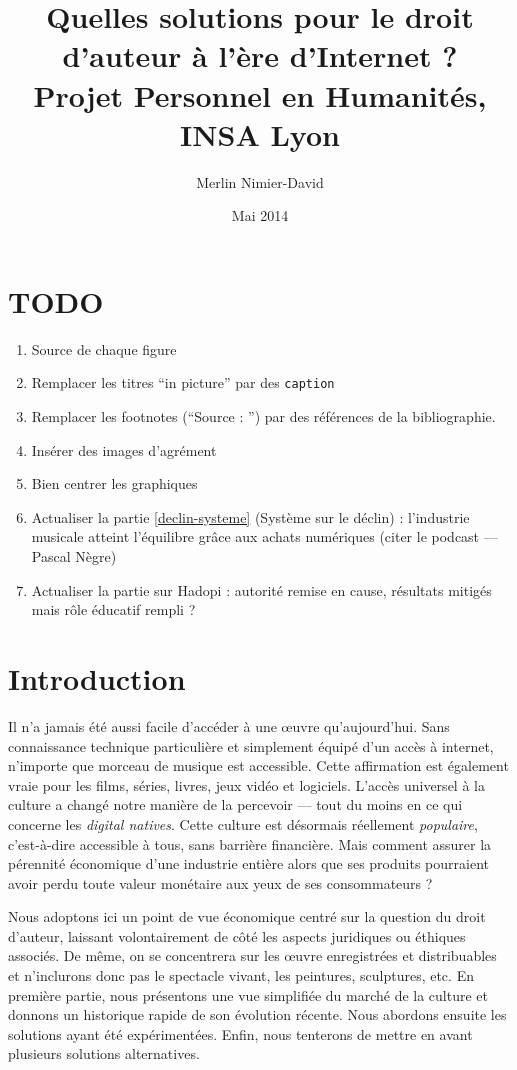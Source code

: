 \documentclass[a4paper]{report}
\title{
	Quelles solutions pour le droit d'auteur à l'ère d'Internet ?\\
	Projet Personnel en Humanités, INSA Lyon
}
\author{Merlin Nimier-David}
\date{Mai 2014}
\begin{document}
	\maketitle

	\tableofcontents

	\chapter{TODO}
	\begin{enumerate}
		\item Source de chaque figure
		\item Remplacer les titres ``in picture'' par des \texttt{caption}
		\item Remplacer les footnotes (``Source : '') par des références de la bibliographie.
		\item Insérer des images d'agrément
		\item Bien centrer les graphiques
		\item Actualiser la partie \ref{declin-systeme} (Système sur le déclin) : l'industrie musicale atteint l'équilibre grâce aux achats numériques (citer le podcast — Pascal Nègre)
		\item Actualiser la partie sur Hadopi : autorité remise en cause, résultats mitigés mais rôle éducatif rempli ?
	\end{enumerate}


	\chapter{Introduction}
	Il n'a jamais été aussi facile d'accéder à une œuvre qu'aujourd'hui. Sans connaissance technique particulière et simplement équipé d'un accès à internet, n'importe que morceau de musique est accessible. Cette affirmation est également vraie pour les films, séries, livres, jeux vidéo et logiciels. L'accès universel à la culture a changé notre manière de la percevoir — tout du moins en ce qui concerne les \emph{digital natives}. Cette culture est désormais réellement \emph{populaire}, c'est-à-dire accessible à tous, sans barrière financière. Mais comment assurer la pérennité économique d'une industrie entière alors que ses produits pourraient avoir perdu toute valeur monétaire aux yeux de ses consommateurs ?

	Nous adoptons ici un point de vue économique centré sur la question du droit d'auteur, laissant volontairement de côté les aspects juridiques ou éthiques associés. De même, on se concentrera sur les œuvre enregistrées et distribuables et n'inclurons donc pas le spectacle vivant, les peintures, sculptures, etc. En première partie, nous présentons une vue simplifiée du marché de la culture et donnons un historique rapide de son évolution récente. Nous abordons ensuite les solutions ayant été expérimentées. Enfin, nous tenterons de mettre en avant plusieurs solutions alternatives.
\end{document}
